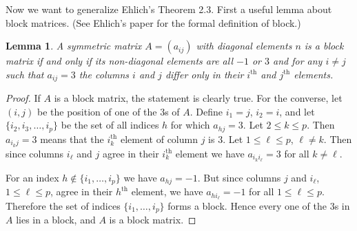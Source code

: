 \documentclass[11pt,a4paper]{article}
\newtheorem{lemma}[theorem]{Lemma}
\begin{document}
Now we want to generalize Ehlich's Theorem 2.3.  First a useful lemma about
block matrices.  (See Ehlich's paper for the formal definition of block.)
\begin{lemma}\label{lem:blockProperty}
A symmetric matrix $A=(a_{ij})$ with diagonal elements $n$ is a block matrix
if and only if its non-diagonal elements are all $-1$ or $3$ and for any
$i\ne j$ such that $a_{ij}=3$ the columns $i$ and $j$ differ only in their
$i^\text{th}$ and $j^\text{th}$ elements.
\end{lemma}
\begin{proof}
If $A$ is a block matrix, the statement is clearly true.  For the converse,
let $(i,j)$ be the position of one of the 3s of $A$.  Define $i_1=j$,
$i_2=i$, and let $\{i_2,i_3,\ldots,i_p\}$ be the set of all indices $h$ for
which $a_{hj}=3$.  Let $2\le k\le p$.  Then $a_{i_kj}=3$ means that the
$i_k^\text{th}$ element of column $j$ is 3. Let $1\le\ell\le p$, $\ell\ne
k$.  Then since columns $i_\ell$ and $j$ agree in their $i_k^\text{th}$
element we have $a_{i_ki_\ell}=3$ for all $k\ne\ell$.

For an index $h\notin\{i_1,\ldots,i_p\}$ we have $a_{hj}=-1$.  But since
columns $j$ and $i_\ell$, $1\le\ell\le p$, agree in their $h^\text{th}$
element, we have $a_{hi_\ell}=-1$ for all $1\le\ell\le p$.  Therefore the
set of indices $\{i_1,\ldots,i_p\}$ forms a block.  Hence every one of the
3s in $A$ lies in a block, and $A$ is a block matrix.
\end{proof}
\end{document}
